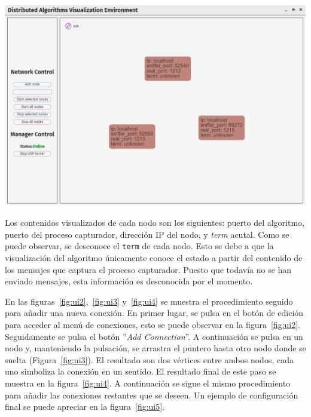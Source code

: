{
\centering
\includegraphics[width=0.9\linewidth]{imagenes/ui1}
\label{fig:ui1}
}

Los contenidos visualizados de cada nodo son los siguientes: puerto del algoritmo, puerto del proceso capturador, dirección IP del nodo, y \textit{term} acutal. Como se puede observar, se desconoce el \texttt{term} de cada nodo. Esto se debe a que la visualización del algoritmo únicamente conoce el estado a partir del contenido de los mensajes que captura el proceso capturador. Puesto que todavía no se han enviado mensajes, esta información es desconocida por el momento.

En las figuras~\ref{fig:ui2},~\ref{fig:ui3} y~\ref{fig:ui4} se muestra el procedimiento seguido para añadir una nueva conexión. En primer lugar, se pulsa en el botón de edición para acceder al menú de conexiones, esto se puede observar en la figura~\ref{fig:ui2}. Seguidamente se pulsa el botón ''\textit{Add Connection}''. A continuación se pulsa en un nodo y, manteniendo la pulsación, se arrastra el puntero hasta otro nodo donde se suelta (Figura~\ref{fig:ui3}). El resultado son dos vértices entre ambos nodos, cada uno simboliza la conexión en un sentido. El resultado final de este paso se muestra en la figura~\ref{fig:ui4}. A continuación se sigue el mismo procedimiento para añadir las conexiones restantes que se deseen. Un ejemplo de configuración final se puede apreciar en la figura~\ref{fig:ui5}.

